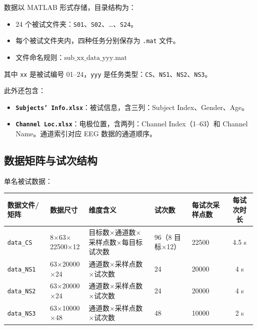 \documentclass[12pt, a4paper]{ctexart}
\newcommand{\ttf}[1]{\texttt{#1}}
\begin{document}
数据以 MATLAB 形式存储，目录结构为：

\begin{itemize}
  \item 24 个被试文件夹：\ttf{S01}、\ttf{S02}、…、\ttf{S24}。
  \item 每个被试文件夹内，四种任务分别保存为 \ttf{.mat} 文件。
  \item 文件命名规则：$\text{sub\_xx\_data\_yyy.mat}$
\end{itemize}

其中 \ttf{xx} 是被试编号 01--24，\ttf{yyy} 是任务类型：\ttf{CS}、\ttf{NS1}、\ttf{NS2}、\ttf{NS3}。

此外还包含：

\begin{itemize}
  \item \textbf{\ttf{Subjects' Info.xlsx}}：被试信息，含三列：Subject Index、Gender、Age。
  \item \textbf{\ttf{Channel Loc.xlsx}}：电极位置，含两列：Channel Index（1--63）和 Channel Name。通道索引对应 EEG 数据的通道顺序。
\end{itemize}

\subsection{数据矩阵与试次结构}

单名被试数据：

\begin{table}[h]
\centering\footnotesize
\begin{tabularx}{\textwidth}{lllllc}
\toprule
\textbf{数据文件/矩阵} & \textbf{数据尺寸} & \textbf{维度含义} & \textbf{试次数} & \textbf{每试次采样点数} & \textbf{每试次时长} \\
\midrule
\ttf{data\_CS} & 8$\times$63$\times$22500$\times$12 & 目标数$\times$通道数$\times$采样点数$\times$每目标试次数 & 96（8 目标$\times$12） & 22500 & 4.5 s \\
\ttf{data\_NS1} & 63$\times$20000$\times$24 & 通道数$\times$采样点数$\times$试次数 & 24 & 20000 & 4 s \\
\ttf{data\_NS2} & 63$\times$20000$\times$24 & 通道数$\times$采样点数$\times$试次数 & 24 & 20000 & 4 s \\
\ttf{data\_NS3} & 63$\times$10000$\times$48 & 通道数$\times$采样点数$\times$试次数 & 48 & 10000 & 2 s \\
\bottomrule
\end{tabularx}
\end{table}
\end{document}

